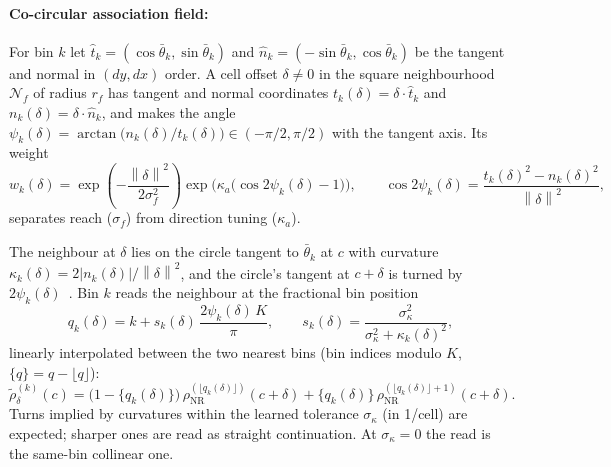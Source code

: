 \documentclass[11pt,a4paper]{article}
\newcommand{\norm}[1]{\left\lVert#1\right\rVert}
\newcommand{\abs}[1]{\left\lvert#1\right\rvert}
\begin{document}
\paragraph{Co-circular association field:}
For bin $k$ let $\hat t_k = (\cos\bar\theta_k, \sin\bar\theta_k)$ and $\hat n_k = (-\sin\bar\theta_k, \cos\bar\theta_k)$ be the tangent and normal in $(dy, dx)$ order. A cell offset $\delta \neq 0$ in the square neighbourhood $\mathcal{N}_f$ of radius $r_f$ has tangent and normal coordinates $t_k(\delta) = \delta \cdot \hat t_k$ and $n_k(\delta) = \delta \cdot \hat n_k$, and makes the angle $\psi_k(\delta) = \arctan\bigl(n_k(\delta)/t_k(\delta)\bigr) \in (-\pi/2, \pi/2)$ with the tangent axis. Its weight
\begin{equation}\label{eq:pos-t}
  w_k(\delta) = \exp\!\left(-\frac{\norm{\delta}^2}{2\sigma_f^2}\right)
                \exp\!\bigl(\kappa_a \bigl(\cos 2\psi_k(\delta) - 1\bigr)\bigr),
  \qquad
  \cos 2\psi_k(\delta) = \frac{t_k(\delta)^2 - n_k(\delta)^2}{\norm{\delta}^2},
\end{equation}
separates reach ($\sigma_f$) from direction tuning ($\kappa_a$).

The neighbour at $\delta$ lies on the circle tangent to $\bar\theta_k$ at $c$ with curvature $\kappa_k(\delta) = 2\abs{n_k(\delta)}/\norm{\delta}^2$, and the circle's tangent at $c + \delta$ is turned by $2\psi_k(\delta)$~\cite{parent1989trace}. Bin $k$ reads the neighbour at the fractional bin position
\begin{equation}\label{eq:cocirc-read}
  q_k(\delta) = k + s_k(\delta)\, \frac{2\psi_k(\delta)\, K}{\pi},
  \qquad
  s_k(\delta) = \frac{\sigma_\kappa^2}{\sigma_\kappa^2 + \kappa_k(\delta)^2},
\end{equation}
linearly interpolated between the two nearest bins (bin indices modulo $K$, $\{q\} = q - \lfloor q \rfloor$):
\begin{equation}\label{eq:cocirc-interp}
  \tilde\rho^{(k)}_{\delta}(c) = \bigl(1 - \{q_k(\delta)\}\bigr)\, \rho_{\mathrm{NR}}^{(\lfloor q_k(\delta) \rfloor)}(c + \delta)
                               + \{q_k(\delta)\}\, \rho_{\mathrm{NR}}^{(\lfloor q_k(\delta) \rfloor + 1)}(c + \delta).
\end{equation}
Turns implied by curvatures within the learned tolerance $\sigma_\kappa$ (in 1/cell) are expected; sharper ones are read as straight continuation. At $\sigma_\kappa = 0$ the read is the same-bin collinear one.
\end{document}
